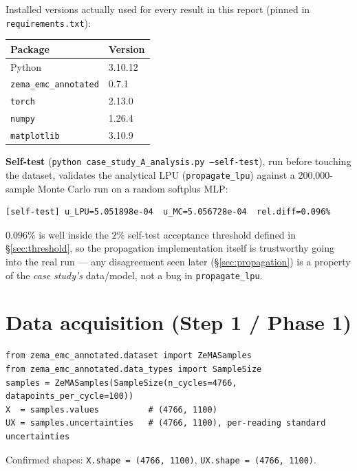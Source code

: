\documentclass[11pt]{article}
\begin{document}
Installed versions actually used for every result in this report (pinned in
\texttt{requirements.txt}):

\begin{center}
\begin{tabular}{@{}ll@{}}
\toprule
Package & Version \\
\midrule
Python & 3.10.12 \\
\texttt{zema\_\allowbreak emc\_\allowbreak annotated} & 0.7.1 \\
\texttt{torch} & 2.13.0 \\
\texttt{numpy} & 1.26.4 \\
\texttt{matplotlib} & 3.10.9 \\
\bottomrule
\end{tabular}
\end{center}

\textbf{Self-test} (\texttt{python case\_\allowbreak study\_\allowbreak A\_\allowbreak analysis.py --self-test}),
run before touching the dataset, validates the analytical LPU
(\texttt{propagate\_lpu}) against a 200{,}000-sample Monte Carlo run on a
random softplus MLP:

\begin{verbatim}
[self-test] u_LPU=5.051898e-04  u_MC=5.056728e-04  rel.diff=0.096%
\end{verbatim}

$0.096\%$ is well inside the $2\%$ self-test acceptance threshold defined in
\S\ref{sec:threshold}, so the propagation implementation itself is
trustworthy going into the real run --- any disagreement seen later
(\S\ref{sec:propagation}) is a property of the \emph{case study's}
data/model, not a bug in \texttt{propagate\_lpu}.

\section{Data acquisition (Step 1 / Phase 1)}
\label{sec:data}

\begin{verbatim}
from zema_emc_annotated.dataset import ZeMASamples
from zema_emc_annotated.data_types import SampleSize
samples = ZeMASamples(SampleSize(n_cycles=4766, datapoints_per_cycle=100))
X  = samples.values          # (4766, 1100)
UX = samples.uncertainties   # (4766, 1100), per-reading standard uncertainties
\end{verbatim}

Confirmed shapes: \texttt{X.shape = (4766, 1100)}, \texttt{UX.shape = (4766,
1100)}.
\end{document}
